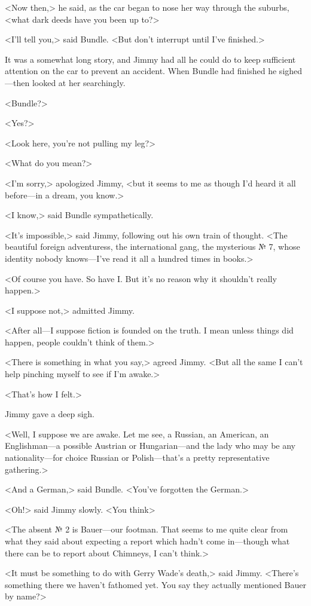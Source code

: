 <Now then,> he said, as the car began to nose her way through the suburbs, <what dark deeds have you been up to?>

<I'll tell you,> said Bundle. <But don't interrupt until I've finished.>

It was a somewhat long story, and Jimmy had all he could do to keep sufficient attention on the car to prevent an accident. When Bundle had finished he sighed—then looked at her searchingly.

<Bundle?>

<Yes?>

<Look here, you're not pulling my leg?>

<What do you mean?>

<I'm sorry,> apologized Jimmy, <but it seems to me as though I'd heard it all before—in a dream, you know.>

<I know,> said Bundle sympathetically.

<It's impossible,> said Jimmy, following out his own train of thought. <The beautiful foreign adventuress, the international gang, the mysterious № 7, whose identity nobody knows—I've read it all a hundred times in books.>

<Of course you have. So have I. But it's no reason why it shouldn't really happen.>

<I suppose not,> admitted Jimmy.

<After all—I suppose fiction is founded on the truth. I mean unless things did happen, people couldn't think of them.>

<There is something in what you say,> agreed Jimmy. <But all the same I can't help pinching myself to see if I'm awake.>

<That's how I felt.>

Jimmy gave a deep sigh.

<Well, I suppose we are awake. Let me see, a Russian, an American, an Englishman—a possible Austrian or Hungarian—and the lady who may be any nationality—for choice Russian or Polish—that's a pretty representative gathering.>

<And a German,> said Bundle. <You've forgotten the German.>

<Oh!> said Jimmy slowly. <You think\longdash>

<The absent № 2 is Bauer—our footman. That seems to me quite clear from what they said about expecting a report which hadn't come in—though what there can be to report about Chimneys, I can't think.>

<It must be something to do with Gerry Wade's death,> said Jimmy. <There's something there we haven't fathomed yet. You say they actually mentioned Bauer by name?>

